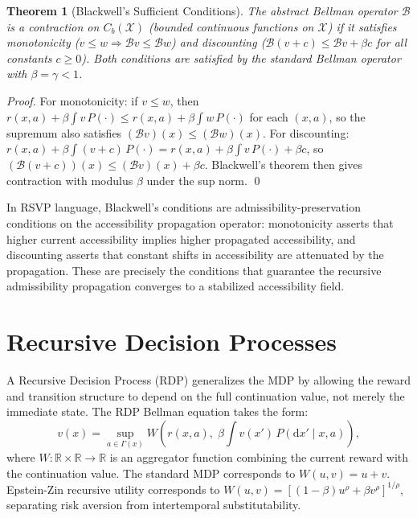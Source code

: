 \documentclass[12pt, a4paper, openany]{book}
\theoremstyle{plain}
\newtheorem{theorem}{Theorem}[chapter]
\theoremstyle{definition}
\theoremstyle{remark}
\newcommand{\BellmanOp}{\mathcal{B}}
\begin{document}
\begin{theorem}[Blackwell's Sufficient Conditions]
The abstract Bellman operator $\BellmanOp$ is a contraction on $C_b(\mathcal{X})$ (bounded continuous functions on $\mathcal{X}$) if it satisfies monotonicity ($v \leq w \Rightarrow \BellmanOp v \leq \BellmanOp w$) and discounting ($\BellmanOp(v + c) \leq \BellmanOp v + \beta c$ for all constants $c \geq 0$). Both conditions are satisfied by the standard Bellman operator with $\beta = \gamma < 1$.
\end{theorem}

\begin{proof}
For monotonicity: if $v \leq w$, then $r(x,a) + \beta \int v \, P(\cdot) \leq r(x,a) + \beta \int w \, P(\cdot)$ for each $(x,a)$, so the supremum also satisfies $(\BellmanOp v)(x) \leq (\BellmanOp w)(x)$. For discounting: $r(x,a) + \beta \int (v+c) \, P(\cdot) = r(x,a) + \beta \int v \, P(\cdot) + \beta c$, so $(\BellmanOp(v+c))(x) \leq (\BellmanOp v)(x) + \beta c$. Blackwell's theorem then gives contraction with modulus $\beta$ under the sup norm. \qed
\end{proof}

In RSVP language, Blackwell's conditions are admissibility-preservation conditions on the accessibility propagation operator: monotonicity asserts that higher current accessibility implies higher propagated accessibility, and discounting asserts that constant shifts in accessibility are attenuated by the propagation. These are precisely the conditions that guarantee the recursive admissibility propagation converges to a stabilized accessibility field.

\section{Recursive Decision Processes}

A Recursive Decision Process (RDP) generalizes the MDP by allowing the reward and transition structure to depend on the full continuation value, not merely the immediate state. The RDP Bellman equation takes the form:
\[
v(x) = \sup_{a \in \Gamma(x)} W\!\left(r(x,a),\; \beta \int v(x') \, P(\mathrm{d}x' \mid x, a)\right),
\]
where $W: \mathbb{R} \times \mathbb{R} \to \mathbb{R}$ is an aggregator function combining the current reward with the continuation value. The standard MDP corresponds to $W(u, v) = u + v$. Epstein-Zin recursive utility corresponds to $W(u,v) = [(1-\beta)u^\rho + \beta v^\rho]^{1/\rho}$, separating risk aversion from intertemporal substitutability.
\end{document}
